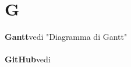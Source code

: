 \newpage
\section{G}\label{l:G}
\textbf{Gantt}\newline vedi "Diagramma di Gantt"\\\\

\textbf{GitHub}\newline vedi